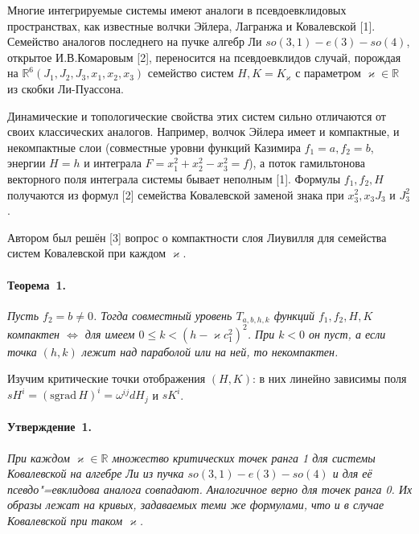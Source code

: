 
\vzmscaption

Многие интегрируемые системы имеют аналоги в псевдоевклидовых пространствах, как известные волчки Эйлера, Лагранжа и Ковалевской [1]. Семейство аналогов последнего на пучке алгебр Ли $so(3,1)-e(3)-so(4)$, открытое И.В.Комаровым [2], переносится на псевдоевклидов случай, порождая на $\mathbb{R}^6(J_1, J_2, J_3, x_1, x_2, x_3)$ семейство систем $H, K = K_{\varkappa}$ с параметром $\varkappa \in \mathbb{R}$ из  скобки Ли-Пуассона.

Динамические и топологические свойства этих систем сильно отличаются от своих классических аналогов. Например, волчок Эйлера имеет и компактные, и некомпактные слои (совместные уровни функций Казимира $f_1 =a, f_2=b$, энергии $H=h$ и интеграла $F = x_1^2 + x_2^2 - x_3^2 =f$), а поток гамильтонова векторного поля интеграла системы бывает неполным [1]. Формулы $f_1, f_2, H$ получаются из формул [2] семейства Ковалевской заменой знака при $x_3^2, x_3 J_3$ и $J_3^2$.

Автором был решён [3] вопрос о компактности слоя Лиувилля для семейства систем Ковалевской при каждом $\varkappa$.
\paragraph{Теорема~1.}
{\it
	Пусть $f_2 = b \ne 0$. Тогда совместный уровень $T_{a, b, h, k}$ функций $f_1, f_2, H, K$ компактен $\Leftrightarrow$ для имеем $0 \le k < (h -\varkappa c_1^2)^2$. При $k <0$ он пуст, а если точка $(h, k)$ лежит над параболой или на ней, то некомпактен.
}

Изучим критические точки отображения $(H, K)$: в них линейно зависимы поля $sH^i = (\mathrm{sgrad}\,H)^i = \omega^{ij} dH_j$ и $sK^i$.

\paragraph{Утверждение~1.}
{\it
	При каждом $\varkappa \in \mathbb{R}$ множество критических точек ранга 1 для системы Ковалевской на алгебре Ли из пучка $so(3,1)-e(3)-so(4)$ и для её псевдо"=евклидова аналога совпадают. Аналогичное верно для точек ранга 0. Их образы лежат на кривых, задаваемых теми же формулами, что и в случае Ковалевской при таком $\varkappa$.
}

